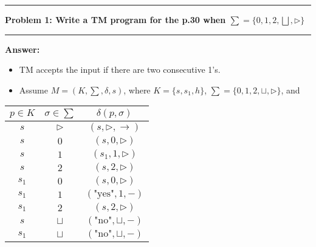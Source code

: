 \documentclass[11pt]{article}
\newcommand\question[2]{\vspace{.25in}\hrule\textbf{#1: #2}\vspace{.5em}\hrule\vspace{.10in}}
\renewcommand\part[1]{\vspace{.10in}\textbf{#1}}
\newcommand\algorithm{\vspace{.10in}\textbf{Algorithm: }}
\begin{document}
\raggedright
\newcommand\NAME{Shiang-Yun Yang 楊翔雲}  %
\newcommand\ANDREWID{R04922067}     %
\newcommand\HWNUM{1}              %



\question{Problem 1}{Write a TM program for the p.30 when $\sum = \{ 0, 1, 2, \bigsqcup, \triangleright \}$}

\part{Answer:} %

\begin{itemize}

\item 
TM accepts the input if there are two consecutive 1's.

\item %
Assume $M = (K, \sum, \delta, s)$, where $K = \{ s, s_1, h \}$, $\sum = \{ 0, 1, 2, \sqcup, \triangleright \}$, and

\end{itemize}

\begin{center}
	\begin{tabular}{|c|c|c|}
	\hline
	$p \in K$ & $ \sigma \in \sum $ & $\delta(p, \sigma)$  \\		
	\hline
	$s$ & $\triangleright$ & $(s, \triangleright, \rightarrow)$  \\
	\hline
	$s$ & $0$ & $(s, 0, \triangleright)$ \\
	\hline
	$s$ & $1$ & $(s_1, 1, \triangleright)$ \\
	\hline
	$s$ & $2$ & $(s, 2, \triangleright)$ \\
	\hline
	$s_1$ & $0$ & $(s, 0, \triangleright)$ \\
	\hline
	$s_1$ & $1$ & $(\text{"yes"}, 1, -)$ \\
	\hline
	$s_1$ & $2$ & $(s, 2, \triangleright)$ \\
	\hline
	$s$ & $\sqcup$ & $(\text{"no"}, \sqcup, -)$ \\
	\hline
	$s_1$ & $\sqcup$ & $(\text{"no"}, \sqcup, -)$ \\
	\hline
	\end{tabular}
\end{center}
\end{document}
